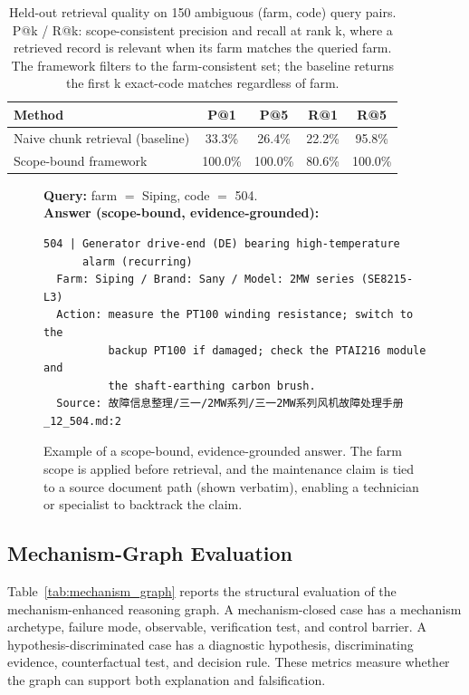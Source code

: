 \documentclass[lettersize,journal]{IEEEtran}
\begin{document}
\begin{table}[htbp]
\caption{Held-out retrieval quality on 150 ambiguous (farm, code) query pairs. P@k / R@k: scope-consistent precision and recall at rank k, where a retrieved record is relevant when its farm matches the queried farm. The framework filters to the farm-consistent set; the baseline returns the first k exact-code matches regardless of farm.}
\label{tab:heldout}
\centering
\small
\begin{tabular}{lcccc}
\toprule
Method & P@1 & P@5 & R@1 & R@5 \\
\midrule
Naive chunk retrieval (baseline) & 33.3\% & 26.4\% & 22.2\% & 95.8\% \\
Scope-bound framework & 100.0\% & 100.0\% & 80.6\% & 100.0\% \\
\bottomrule
\end{tabular}
\end{table}

\begin{figure}[t]
\centering
\begin{minipage}{\columnwidth}
\small
\textbf{Query:} farm $=$ Siping, code $=$ 504. \\
\textbf{Answer (scope-bound, evidence-grounded):} \\
\medskip
\begin{verbatim}
504 | Generator drive-end (DE) bearing high-temperature
      alarm (recurring)
  Farm: Siping / Brand: Sany / Model: 2MW series (SE8215-L3)
  Action: measure the PT100 winding resistance; switch to the
          backup PT100 if damaged; check the PTAI216 module and
          the shaft-earthing carbon brush.
  Source: 故障信息整理/三一/2MW系列/三一2MW系列风机故障处理手册_12_504.md:2
\end{verbatim}
\end{minipage}
\caption{Example of a scope-bound, evidence-grounded answer. The farm scope is applied before retrieval, and the maintenance claim is tied to a source document path (shown verbatim), enabling a technician or specialist to backtrack the claim.}
\label{fig:grounding_example}
\end{figure}

\subsection{Mechanism-Graph Evaluation}
Table~\ref{tab:mechanism_graph} reports the structural evaluation of the mechanism-enhanced reasoning graph. A mechanism-closed case has a mechanism archetype, failure mode, observable, verification test, and control barrier. A hypothesis-discriminated case has a diagnostic hypothesis, discriminating evidence, counterfactual test, and decision rule. These metrics measure whether the graph can support both explanation and falsification.
\end{document}
